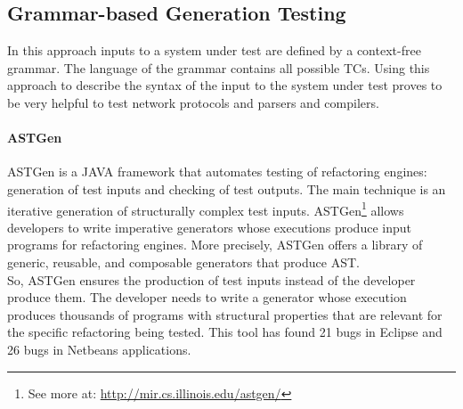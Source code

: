 \subsection{Grammar-based Generation Testing}
In this approach inputs to a system under test are defined by a context-free grammar. The language of the grammar contains all possible \ac{TC}s.
Using this approach to describe the syntax of the input to the system under test proves to be very helpful to test
network protocols\cite{tal:syntax-based,kaksonen2001functional} and parsers and compilers\cite{1994-burgess,Burgess_Saidi_1996}.

\paragraph{ASTGen}
ASTGen\cite{Daniel:2007:ATR:1287624.1287651} is a JAVA framework that automates testing of refactoring engines: generation of test inputs
and checking of test outputs. The main technique is an iterative generation of structurally complex test inputs.
ASTGen\footnote{See more at: \url{http://mir.cs.illinois.edu/astgen/}} allows developers to write imperative generators whose executions
produce input programs for refactoring engines. More precisely, ASTGen
offers a library of generic, reusable, and composable generators that produce \ac{AST}.\\
So, ASTGen ensures the production of test inputs instead of the developer produce them. The developer needs to write a generator whose execution
produces thousands of programs with structural properties that are relevant for the specific refactoring being tested. This tool has found
21 bugs in Eclipse and 26 bugs in Netbeans applications.

